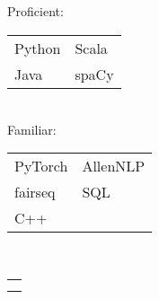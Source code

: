 {		\majorsection{\projects} 
		\projectParasite 
		\projectPytext 
		

	}{ %
		
		\noindent\begin{minipage}[t]{0.275\textwidth}
			
			\sidesection{\educationhistory}	\\[0.25\baselineskip]
			\educationUW 
			\educationEvergreen
			\educationHyogo
			
			\sidesection{\courses} \\
			\sidebarcoursework
			
			
			\sidesection{\skills} \\ 
			\sidesubsection{\skillsprogramming} \\
			Proficient:\\[0.25\baselineskip]
			\begin{tabular}{l l}
				Python &  Scala \\ 
				Java  & spaCy  \\ 
			\end{tabular}\\
			Familiar: \\[0.25\baselineskip]
			\begin{tabular}{l l} 
			    PyTorch & AllenNLP \\
				fairseq & SQL \\
				C++
			\end{tabular}

			
			\sidesubsection{\skillslanguage} \\
			\begin{tabular}{l}
				\skillenglish \\
				\skilljapanese
			\end{tabular} \quarterlinebreak \\
			
			
		\end{minipage}
		\hfill
		\begin{minipage}[t]{0.7\textwidth}
			\majorsection{\experience} 
				\jobexpNPD
				\jobexpGSP
				\jobexpGDIIntern	
		\majorsection{\graduatecoursework} 
		\courseworkML
		\courseworkNLM
		\courseworkNLP

		\majorsection{\projectsawards\vspace{-0.25\baselineskip}} 
		\awardAmplify 
		\awardGoldenTicket 
		\awardParasite
		
		\end{minipage}
		
	}
	
